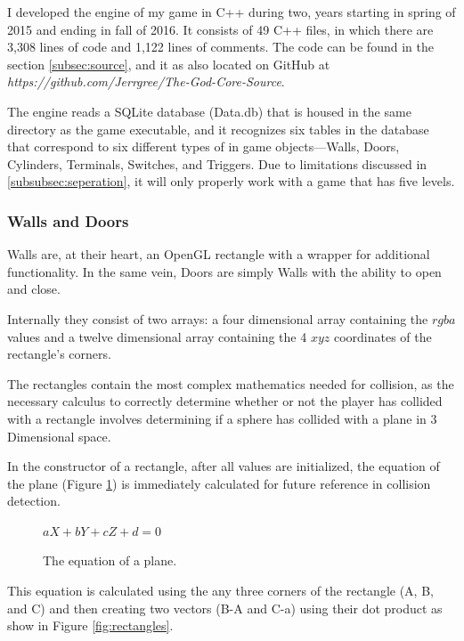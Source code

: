\documentclass{article}
\begin{document}
I developed the engine of my game in C++ during two, years starting in spring of 2015 and ending in fall of 2016. It consists of 49 C++ files, in which there are 3,308 lines of code and 1,122 lines of comments. The code can be found in the section \ref{subsec:source}, and it as also located on GitHub at \emph{https://github.com/Jerrgree/The-God-Core-Source}.

The engine reads a SQLite database (Data.db) that is housed in the same directory as the game executable, and it recognizes six tables in the database that correspond to six different types of in game objects---Walls, Doors, Cylinders, Terminals, Switches, and Triggers. Due to limitations discussed in \ref{subsubsec:seperation}, it will only properly work with a game that has five levels.

\subsubsection{Walls and Doors} \label{subsubsec:walls}

Walls are, at their heart, an OpenGL rectangle with a wrapper for additional functionality. In the same vein, Doors are simply Walls with the ability to open and close.

Internally they consist of two arrays: a four dimensional array containing the $rgba$ values and a twelve dimensional array containing the 4 $xyz$ coordinates of the rectangle's corners. 

The rectangles contain the most complex mathematics needed for collision, as the necessary calculus to correctly determine whether or not the player has collided with a rectangle involves determining if a sphere has collided with a plane in 3 Dimensional space.

In the constructor of a rectangle, after all values are initialized, the equation of the plane (Figure \ref{fig:plane}) is immediately calculated for future reference in collision detection.

\begin{figure}[H]
	\centering
	$aX + bY + cZ + d = 0$
	\caption{The equation of a plane.}
	\label{fig:plane}
\end{figure}

This equation is calculated using the any three corners of the rectangle (A, B, and C) and then creating two vectors (B-A and C-a) using their dot product as show in Figure \ref{fig:rectangles}.
\end{document}
